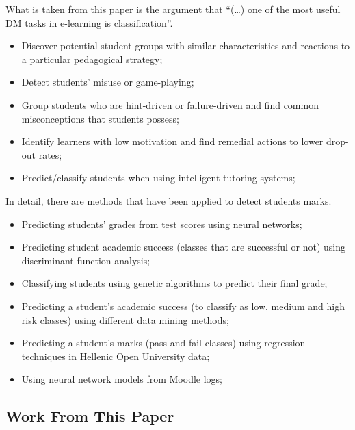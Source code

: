 What is taken from this paper is the argument that ``(\dots) one of the most
useful DM tasks in e-learning is classification''.

\begin{itemize}
    \item Discover potential student groups with similar characteristics and
        reactions to a particular pedagogical strategy; 
    \item Detect students' misuse or game-playing; 
    \item Group students who are hint-driven or failure-driven and find common
        misconceptions that students possess; 
    \item Identify learners with low motivation and find remedial actions to
        lower drop-out rates; 
    \item Predict/classify students when using intelligent tutoring systems;
\end{itemize}

In detail, there are methods that have been applied to detect students marks.

\begin{itemize}
    \item Predicting students' grades from test scores using neural networks;
    \item Predicting student academic success (classes that are successful or
        not) using discriminant function analysis; 
    \item Classifying students using genetic algorithms to predict their final
        grade; 
    \item Predicting a student's academic success (to classify as low, medium
        and high risk classes) using different data mining methods; 
    \item Predicting a student’s marks (pass and fail classes) using regression
        techniques in Hellenic Open University data; 
    \item Using neural network models from Moodle logs; 
\end{itemize}

\subsection{Work From This Paper}


